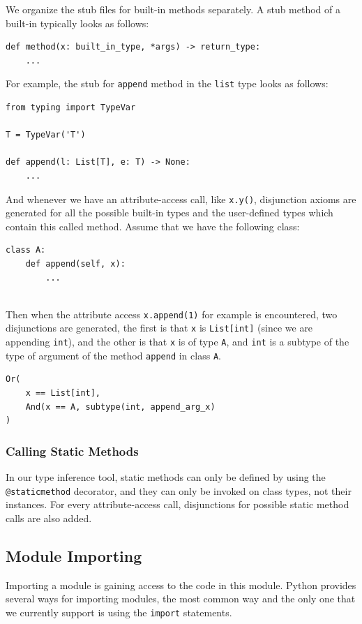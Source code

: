 We organize the stub files for built-in methods separately. A stub method of a built-in typically looks as follows:

\begin{lstlisting}
def method(x: built_in_type, *args) -> return_type:
	...
\end{lstlisting}

For example, the stub for \lstinline|append| method in the \lstinline|list| type looks as follows:

\begin{lstlisting}
from typing import TypeVar

T = TypeVar('T')

def append(l: List[T], e: T) -> None:
	...
\end{lstlisting}

And whenever we have an attribute-access call, like \lstinline|x.y()|, disjunction axioms are generated for all the possible built-in types and the user-defined types which contain this called method. Assume that we have the following class:

\begin{lstlisting}
class A:
	def append(self, x):
		...
		
\end{lstlisting}

Then when the attribute access \lstinline|x.append(1)| for example is encountered, two disjunctions are generated, the first is that \lstinline|x| is \lstinline|List[int]| (since we are appending \lstinline|int|), and the other is that \lstinline|x| is of type \lstinline|A|, and \lstinline|int| is a subtype of the type of argument of the method \lstinline|append| in class \lstinline|A|.

\begin{lstlisting}
Or(
	x == List[int],
	And(x == A, subtype(int, append_arg_x)
)
\end{lstlisting}

\subsubsection{Calling Static Methods}
In our type inference tool, static methods can only be defined by using the \lstinline|@staticmethod| decorator, and they can only be invoked on class types, not their instances. For every attribute-access call, disjunctions for possible static method calls are also added.

\subsection{Module Importing}
Importing a module is gaining access to the code in this module. Python provides several ways for importing modules, the most common way and the only one that we currently support is using the \lstinline|import| statements.

